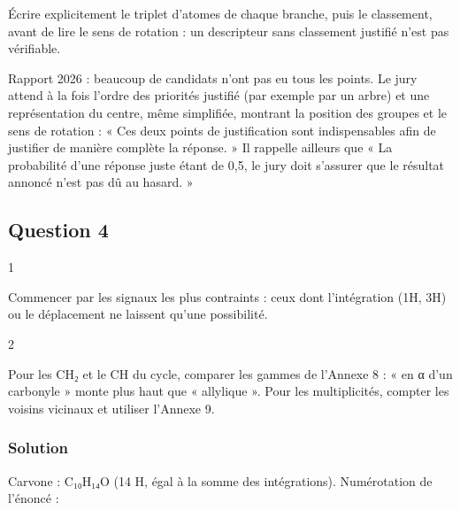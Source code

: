 \documentclass[11pt,a4paper]{article}
\newcommand{\equationajustee}[1]{%
  \sbox{\boiteequation}{$\displaystyle #1$}%
  \ifdim\wd\boiteequation>\linewidth
    \[\resizebox{\linewidth}{!}{\usebox{\boiteequation}}\]%
  \else
    \[#1\]%
  \fi}
\begin{document}
\equationajustee{\boxed{\text{C6 : } R}}

\begin{methode}

Écrire explicitement le triplet d'atomes de chaque branche, puis le classement, avant de lire le sens de rotation : un descripteur sans classement justifié n'est pas vérifiable.

\end{methode}

\begin{jury}

Rapport 2026 : beaucoup de candidats n'ont pas eu tous les points. Le jury attend à la fois l'ordre des priorités justifié (par exemple par un arbre) et une représentation du centre, même simplifiée, montrant la position des groupes et le sens de rotation : « Ces deux points de justification sont indispensables afin de justifier de manière complète la réponse. » Il rappelle ailleurs que « La probabilité d'une réponse juste étant de 0,5, le jury doit s'assurer que le résultat annoncé n'est pas dû au hasard. »

\end{jury}

\hypertarget{question-4}{%
\subsection{Question 4}\label{question-4}}

\begin{indication}{1}

Commencer par les signaux les plus contraints : ceux dont l'intégration (1H, 3H) ou le déplacement ne laissent qu'une possibilité.

\end{indication}

\begin{indication}{2}

Pour les CH₂ et le CH du cycle, comparer les gammes de l'Annexe 8 : « en α d'un carbonyle » monte plus haut que « allylique ». Pour les multiplicités, compter les voisins vicinaux et utiliser l'Annexe 9.

\end{indication}

\hypertarget{solution-3}{%
\subsubsection{Solution}\label{solution-3}}

Carvone : C₁₀H₁₄O (14 H, égal à la somme des intégrations). Numérotation de l'énoncé :
\end{document}
